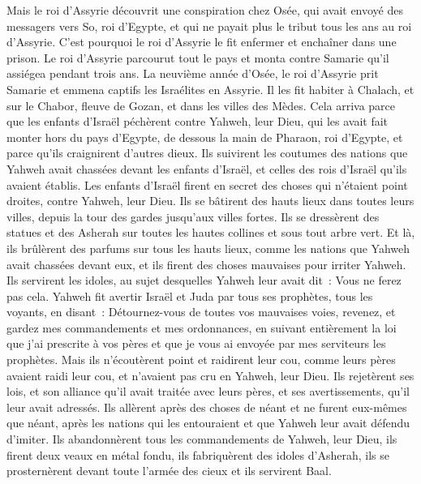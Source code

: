 \begin{multicols}{2}
Mais le roi d'Assyrie découvrit une conspiration chez Osée, qui avait envoyé des messagers vers So, roi d'Egypte, et qui ne payait plus le tribut tous les ans au roi d'Assyrie. C'est pourquoi le roi d'Assyrie le fit enfermer et enchaîner dans une prison.
Le roi d'Assyrie parcourut tout le pays et monta contre Samarie qu'il assiégea pendant trois ans.
La neuvième année d'Osée, le roi d'Assyrie prit Samarie et emmena captifs les Israélites en Assyrie. Il les fit habiter à Chalach, et sur le Chabor, fleuve de Gozan, et dans les villes des Mèdes.
Cela arriva parce que les enfants d'Israël péchèrent contre Yahweh, leur Dieu, qui les avait fait monter hors du pays d'Egypte, de dessous la main de Pharaon, roi d'Egypte, et parce qu'ils craignirent d'autres dieux.
Ils suivirent les coutumes des nations que Yahweh avait chassées devant les enfants d'Israël, et celles des rois d'Israël qu'ils avaient établis.
Les enfants d'Israël firent en secret des choses qui n'étaient point droites, contre Yahweh, leur Dieu. Ils se bâtirent des hauts lieux dans toutes leurs villes, depuis la tour des gardes jusqu'aux villes fortes.
Ils se dressèrent des statues et des Asherah sur toutes les hautes collines et sous tout arbre vert.
Et là, ils brûlèrent des parfums sur tous les hauts lieux, comme les nations que Yahweh avait chassées devant eux, et ils firent des choses mauvaises pour irriter Yahweh.
Ils servirent les idoles, au sujet desquelles Yahweh leur avait dit~: Vous ne ferez pas cela.
Yahweh fit avertir Israël et Juda par tous ses prophètes, tous les voyants, en disant~: Détournez-vous de toutes vos mauvaises voies, revenez, et gardez mes commandements et mes ordonnances, en suivant entièrement la loi que j'ai prescrite à vos pères et que je vous ai envoyée par mes serviteurs les prophètes.
Mais ils n'écoutèrent point et raidirent leur cou, comme leurs pères avaient raidi leur cou, et n'avaient pas cru en Yahweh, leur Dieu.
Ils rejetèrent ses lois, et son alliance qu'il avait traitée avec leurs pères, et ses avertissements, qu'il leur avait adressés. Ils allèrent après des choses de néant et ne furent eux-mêmes que néant, après les nations qui les entouraient et que Yahweh leur avait défendu d'imiter.
Ils abandonnèrent tous les commandements de Yahweh, leur Dieu, ils firent deux veaux en métal fondu, ils fabriquèrent des idoles d'Asherah, ils se prosternèrent devant toute l'armée des cieux et ils servirent Baal.

\end{multicols}
